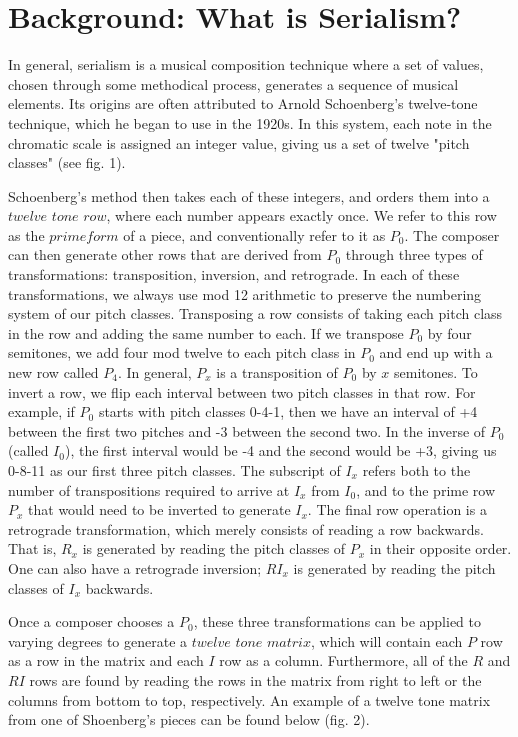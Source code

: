 \section{Background: What is Serialism?}

In general, serialism is a musical composition technique where a set of values, chosen through some methodical process,
generates a sequence of musical elements. Its origins are often attributed to Arnold Schoenberg's twelve-tone technique, which
he began to use in the 1920s. In this system, each note in the chromatic scale is assigned an integer value, giving us a set of twelve
"pitch classes" (see fig. 1).

Schoenberg's method then takes each of these integers, and orders them into a $twelve$ $tone$ $row$, where each number appears
exactly once. We refer to this row as the $prime form$ of a piece, and conventionally refer to it as $P_0$. The
composer can then generate other rows that are derived from $P_0$ through three types of transformations: transposition, inversion, and retrograde. In each of these transformations, we always use mod 12 arithmetic to preserve the numbering system of our pitch classes. Transposing a row consists of taking each pitch class in the row and adding the same number to each. If we transpose $P_0$ by four semitones, we add four mod twelve to each pitch class in $P_0$ and end up with a new row called $P_4$. In general, $P_x$ is a transposition of $P_0$ by $x$ semitones. To invert a row, we flip each interval between two pitch classes in that row. For example, if $P_0$ starts with pitch classes 0-4-1, then we have an interval of +4 between the first two pitches and -3 between the second two. In the inverse of $P_0$ (called $I_0$), the first interval would be -4 and the second would be +3, giving us 0-8-11 as our first three pitch classes. The subscript of $I_x$  refers both to the number of transpositions required to arrive at $I_x$ from $I_0$, and to the prime row $P_x$ that would need to be inverted to generate $I_x$. The final row operation is a retrograde transformation, which merely consists of reading a row backwards. That is, $R_x$ is generated by reading the pitch classes of $P_x$ in their opposite order. One can also have a retrograde inversion; $RI_x$ is generated by reading the pitch classes of $I_x$ backwards.

Once a composer chooses a $P_0$, these three transformations can be applied to varying degrees to generate a $twelve$ $tone$ $matrix$, which will contain each $P$ row as a row in the matrix and each $I$ row as a column. Furthermore, all of the $R$ and $RI$ rows are found by reading the rows in the matrix from right to left or the columns from bottom to top, respectively. An example of a twelve tone matrix from one of Shoenberg's pieces can be found below (fig. 2).


